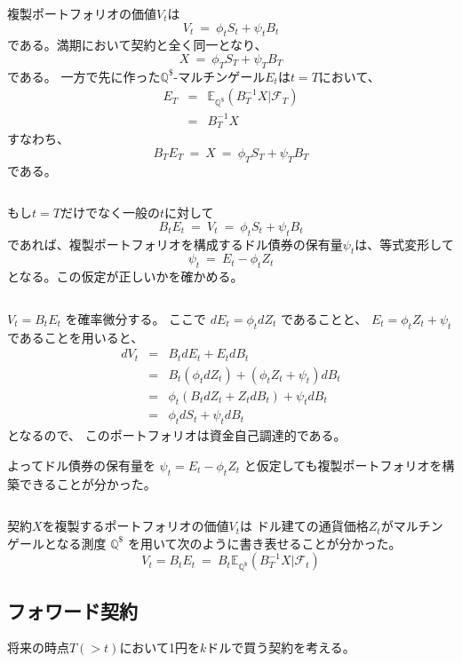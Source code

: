 \documentclass[uplatex,a4j,12pt,dvipdfmx]{jsarticle}
\begin{document}
複製ポートフォリオの価値$V_{t}$は
$$
	V_{t}
	\ = \
	\phi_{t} S_{t} + \psi_{t} B_{t}
$$
である。満期において契約と全く同一となり、
$$
	X
	\ = \
	\phi_{T} S_{T} + \psi_{T} B_{T}
$$
である。
一方で先に作った$\mathbb{Q}^{\$}$-マルチンゲール$E_{t}$は$t=T$において、
%
%
\begin{eqnarray*}
	E_{T}
	&=&
	\mathbb{E}_{\mathbb{Q}^{ \$ }}
	( B_{T}^{-1} X | \mathcal{F}_{T} )
	\\ &=&
	B_{T}^{-1} X
\end{eqnarray*}
%
%
すなわち、
$$
	B_{T} E_{T}
	\ = \
	X
	\ = \
	\phi_{T} S_{T} + \psi_{T} B_{T}
$$
である。

${}$

もし$t=T$だけでなく一般の$t$に対して
$$
	B_{t} E_{t}
	\ = \
	V_{t}
	\ = \
	\phi_{t} S_{t} + \psi_{t} B_{t}
$$
であれば、複製ポートフォリオを構成するドル債券の保有量$\psi_{t}$は、等式変形して
$$
	\psi_{t}
	\ = \
	E_{t} - \phi_{t} Z_{t}
$$
となる。この仮定が正しいかを確かめる。

${}$

$V_{t} = B_{t} E_{t}$
を確率微分する。
ここで
$dE_{t} = \phi_{t} dZ_{t}$
であることと、
$E_{t} = \phi_{t} Z_{t} + \psi_{t}$
であることを用いると、
%
%
\begin{eqnarray*}
	d V_{t}
	&=&
	B_{t} d E_{t}
	+
	E_{t} d B_{t}
	\\ &=&
	B_{t} ( \phi_{t} dZ_{t} )
	+
	( \phi_{t} Z_{t} + \psi_{t} ) d B_{t}
	\\ &=&
	\phi_{t}
	(B_{t} dZ_{t} + Z_{t} dB_{t})
	+
	\psi_{t}
	dB_{t}
	\\ &=&
	\phi_{t}
	dS_{t}
	+
	\psi_{t}
	dB_{t}
\end{eqnarray*}
%
%
となるので、
このポートフォリオは資金自己調達的である。

よってドル債券の保有量を
$\psi_{t} = E_{t} - \phi_{t} Z_{t}$
と仮定しても複製ポートフォリオを構築できることが分かった。

${}$

契約$X$を複製するポートフォリオの価値$V_{t}$は
ドル建ての通貨価格$Z_{t}$がマルチンゲールとなる測度
$\mathbb{Q}^{ \$ }$
を用いて次のように書き表せることが分かった。
$$
	V_{t}
	=
	B_{t} E_{t}
	\ = \
	B_{t}
	\mathbb{E}_{\mathbb{Q}^{ \$ }}
	( B_{T}^{-1} X | \mathcal{F}_{t} )
$$
\subsection{フォワード契約}

将来の時点$T(>t)$において1円を$k$ドルで買う契約を考える。
\end{document}
